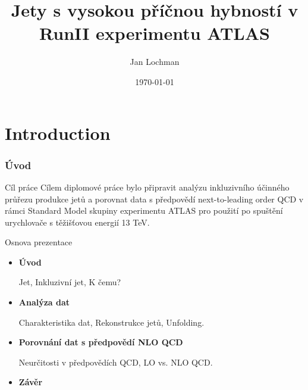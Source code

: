 \documentclass[compress]{beamer}
\title[High $\pt$ jets]{Jety s vysokou p\v{r}\'{i}\v{c}nou hybnost\'{i} v RunII
experimentu ATLAS}
\author{Jan Lochman}
\institute[FNSPE CTU] 
{
  Vedouc\'{i} pr\'{a}ce: Ing. Zden\v{e}k Hub\'{a}\v{c}ek, Ph.D.

  \medskip
  \medskip
  \medskip
  \large
  Obhajoba diplomov\'{e} pr\'{a}ce \\ 
  \medskip
}
\date{\today}
\begin{document}

\begin{frame}
\titlepage 
\end{frame}

\section{Introduction}

\begin{frame}
\frametitle{\'{U}vod}
\begin{block}{C\'{i}l pr\'{a}ce}
  C\'{i}lem diplomov\'{e} pr\'{a}ce bylo p\v{r}ipravit anal\'{y}zu
  inkluzivn\'{i}ho
  \'{u}\v{c}inn\'{e}ho pr\r{u}\v{r}ezu
  produkce jet\r{u} a porovnat data s p\v{r}edpov\v{e}d\'{i} next-to-leading order
  QCD v r\'{a}mci
  Standard Model skupiny experimentu ATLAS pro pou\v{z}it\'{i} po
  spu\v{s}t\v{e}n\'{i} urychlova\v{c}e s
  t\v{e}\v{z}i\v{s}\v{t}ovou energi\'{i} 13 TeV.
\end{block}
\begin{block}{Osnova prezentace}
\begin{itemize}
  \item \textbf{\'{U}vod} 

    Jet, Inkluzivn\'{i} jet, K \v{c}emu?
  \item \textbf{Anal\'{y}za dat}

    Charakteristika dat, Rekonstrukce jet\r{u}, Unfolding.
  \item \textbf{Porovn\'{a}n\'{i} dat s p\v{r}edpov\v{e}d\'{i} NLO QCD}

    Neur\v{c}itosti v p\v{r}edpov\v{e}d\'{i}ch QCD, LO vs. NLO QCD.

  \item \textbf{Z\'{a}v\v{e}r}
\end{itemize}
\end{block}
\end{frame}
\end{document}
